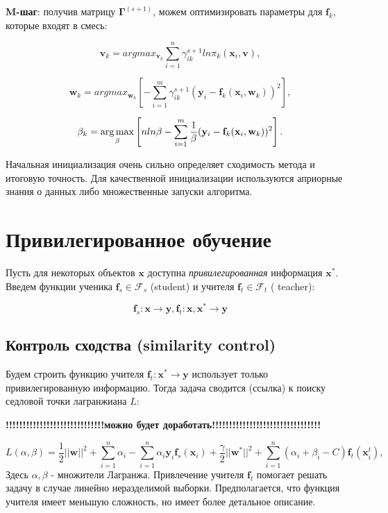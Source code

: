 \documentclass[12pt,twoside]{article}
\begin{document}
\textbf{M-шаг}: получив матрицу $\boldsymbol{\Gamma}^{(s + 1)}$, можем оптимизировать параметры для $\mathbf{f}_k$, которые входят в смесь:

$$ \mathbf{v}_k = argmax_{\mathbf{v}_k} \sum\limits_{i=1}^{n} \gamma_{ik}^{s+1} ln \pi_k (\mathbf{x}_i, \mathbf{v}),$$

$$ \mathbf{w}_k = argmax_{\mathbf{w}_k} \left[   -\sum\limits_{i=1}^m \gamma_{ik}^{s+1} (  \mathbf{y}_i - \mathbf{f}_k (\mathbf{x}_i,
 \mathbf{w}_k)   )^2               \right],$$

$$ \beta_k = \argmax_\beta  \left[  n ln \beta - \sum\limits_{i=1}^m \frac{1}{\beta}  
 (\mathbf{y}_i -  \mathbf{f}_k (\mathbf{x}_i, \mathbf{w}_k)   )^2
  \right].$$

Начальная инициализация очень сильно определяет сходимость метода и итоговую точность. Для качественной инициализации используются априорные знания о данных либо множественные запуски алгоритма.

\section{Привилегированное обучение}

Пусть для некоторых объектов $\mathbf{x}$ доступна \emph{привилегированная} информация $\mathbf{x}^*$. Введем функции ученика $\mathbf{f}_s  \in \mathcal{F}_s$ (student) и учителя $\mathbf{f}_t \in \mathcal{F}_t$ ( teacher):

$$ \mathbf{f}_s: \mathbf{x} \rightarrow \mathbf{y},   \mathbf{f}_t: \mathbf{x}, \mathbf{x}^* \rightarrow \mathbf{y}$$

\subsection{Контроль сходства (similarity control)}

Будем строить функцию учителя $  \mathbf{f}_t:  \mathbf{x}^* \rightarrow \mathbf{y} $ использует только привилегированную информацию. Тогда задача сводится (ссылка) к поиску седловой точки лагранжиана $L$:

\textbf{!!!!!!!!!!!!!!!!!!!!!!!!!!!!!можно будет доработать!!!!!!!!!!!!!!!!!!!!!!!!!!!!!!!!}

$$ L(\alpha, \beta) = \frac{1}{2} || \mathbf{w}||^2  + \sum\limits_{i=1}^n \alpha_i - \sum\limits_{i=1}^n \alpha_i \mathbf{y}_i 
\mathbf{f}_s(\mathbf{x}_i) + \frac{\gamma}{2} || \mathbf{w}^*||^2  + \sum\limits_{i=1}^n (\alpha_i +\beta_i -C) \mathbf{f}_t (\mathbf{x}_i^t) ,                                                           $$
Здесь $\alpha, \beta$ - множители Лагранжа. Привлечение учителя $\mathbf{f}_t$ помогает решать задачу в случае линейно 
неразделимой выборки. Предполагается, что функция учителя имеет меньшую сложность, но имеет более детальное описание.
\end{document}
